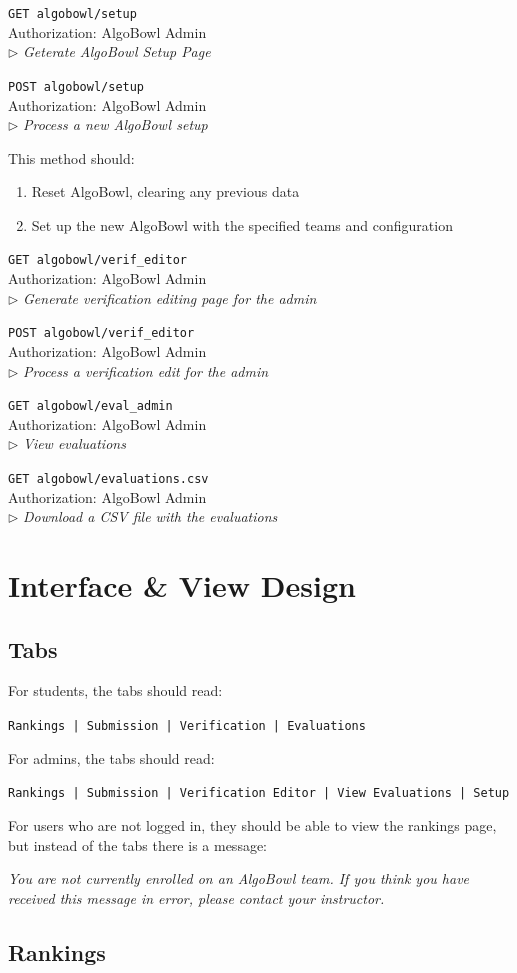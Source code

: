 \documentclass[12pt]{article}
\newcommand\ctrltitle[1]{\par\medskip\texttt{\large #1}\\}
\newcommand\ctrlauth[1]{Authorization: #1\\}
\newcommand\ctrldesc[1]{$\rhd$ \textsl{#1}\par\medskip}
\begin{document}
\ctrltitle{GET algobowl/setup}
\ctrlauth{AlgoBowl Admin}
\ctrldesc{Geterate AlgoBowl Setup Page}

\ctrltitle{POST algobowl/setup}
\ctrlauth{AlgoBowl Admin}
\ctrldesc{Process a new AlgoBowl setup}

This method should:
\begin{enumerate}
    \item Reset AlgoBowl, clearing any previous data
    \item Set up the new AlgoBowl with the specified teams and configuration
\end{enumerate}

\ctrltitle{GET algobowl/verif\_editor}
\ctrlauth{AlgoBowl Admin}
\ctrldesc{Generate verification editing page for the admin}

\ctrltitle{POST algobowl/verif\_editor}
\ctrlauth{AlgoBowl Admin}
\ctrldesc{Process a verification edit for the admin}

\ctrltitle{GET algobowl/eval\_admin}
\ctrlauth{AlgoBowl Admin}
\ctrldesc{View evaluations}

\ctrltitle{GET algobowl/evaluations.csv}
\ctrlauth{AlgoBowl Admin}
\ctrldesc{Download a CSV file with the evaluations}

\section{Interface \& View Design}

\subsection{Tabs}

For students, the tabs should read:

\texttt{Rankings | Submission | Verification | Evaluations}

For admins, the tabs should read:

\texttt{Rankings | Submission | Verification Editor | View Evaluations | Setup}

For users who are not logged in, they should be able to view the rankings page,
but instead of the tabs there is a message:

\emph{You are not currently enrolled on an AlgoBowl team. If you think you have
received this message in error, please contact your instructor.}

\subsection{Rankings}
\end{document}
